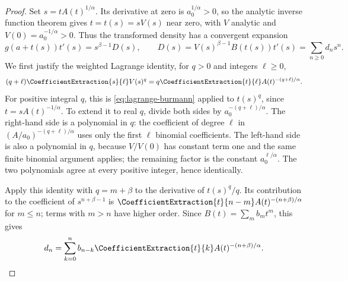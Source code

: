 \documentclass[11pt,a4paper,oneside,openany]{book}
\theoremstyle{definition}
\theoremstyle{remark}
\begin{document}
\begin{proof}
Set $s=tA(t)^{1/\alpha}$.  Its derivative at zero is
$a_0^{1/\alpha}>0$, so the analytic inverse function theorem gives
$t=t(s)=sV(s)$ near zero, with $V$ analytic and $V(0)=a_0^{-1/\alpha}>0$.
Thus the transformed density has a convergent expansion
\[
 g(a+t(s))t'(s)=s^{\beta-1}D(s),\qquad
 D(s)=V(s)^{\beta-1}B(t(s))t'(s)=\sum_{n\ge0}d_ns^n.
\]
We first justify the weighted Lagrange identity, for $q>0$ and integers
$\ell\ge0$,
\[
 (q+\ell)\CoefficientExtraction{s}{\ell}V(s)^q
 =q\CoefficientExtraction{t}{\ell}A(t)^{-(q+\ell)/\alpha}.
\]
For positive integral $q$, this is \eqref{eq:lagrange-burmann} applied to
$t(s)^q$, since $t=sA(t)^{-1/\alpha}$.  To extend it to real $q$, divide both
sides by $a_0^{-(q+\ell)/\alpha}$.  The right-hand side is a polynomial in
$q$: the coefficient of degree $\ell$ in
$(A/a_0)^{-(q+\ell)/\alpha}$ uses only the first $\ell$ binomial coefficients.
The left-hand side is also a polynomial in $q$, because
$V/V(0)$ has constant term one and the same finite binomial argument applies;
the remaining factor is the constant $a_0^{\ell/\alpha}$.
The two polynomials agree at every positive integer, hence identically.

Apply this identity with $q=m+\beta$ to the derivative of
$t(s)^q/q$.  Its contribution to the coefficient of $s^{n+\beta-1}$ is
$\CoefficientExtraction{t}{n-m}A(t)^{-(n+\beta)/\alpha}$ for $m\le n$;
terms with $m>n$ have higher order.  Since $B(t)=\sum_m b_mt^m$, this gives
\[
 d_n=\sum_{k=0}^{n}b_{n-k}\CoefficientExtraction{t}{k}A(t)^{-(n+\beta)/\alpha}.
\]


\end{proof}
\end{document}
